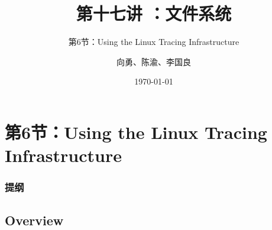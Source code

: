 


\title[第17讲]{第十七讲 ：文件系统} %
\subtitle{第6节：Using the Linux Tracing Infrastructure}
\author{向勇、陈渝、李国良} %
\date{\today} %



\begin{frame}
\titlepage %
\end{frame}
\section{第6节：Using the Linux Tracing Infrastructure}
% 
\begin{frame}
\frametitle{提纲} %
\tableofcontents %
\end{frame}
\subsection{Overview}

